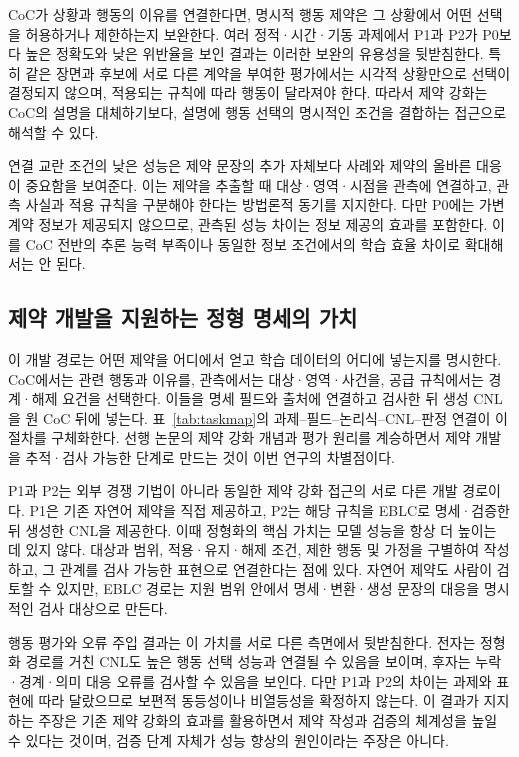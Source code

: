 \documentclass[10pt,a4paper,twocolumn]{article}\usepackage[margin=18mm]{geometry}\usepackage{fontspec,kotex}
\begin{document}
CoC가 상황과 행동의 이유를 연결한다면, 명시적 행동 제약은 그 상황에서 어떤 선택을 허용하거나 제한하는지 보완한다. 여러 정적·시간·기동 과제에서 P1과 P2가 P0보다 높은 정확도와 낮은 위반율을 보인 결과는 이러한 보완의 유용성을 뒷받침한다. 특히 같은 장면과 후보에 서로 다른 계약을 부여한 평가에서는 시각적 상황만으로 선택이 결정되지 않으며, 적용되는 규칙에 따라 행동이 달라져야 한다. 따라서 제약 강화는 CoC의 설명을 대체하기보다, 설명에 행동 선택의 명시적인 조건을 결합하는 접근으로 해석할 수 있다.\par

연결 교란 조건의 낮은 성능은 제약 문장의 추가 자체보다 사례와 제약의 올바른 대응이 중요함을 보여준다. 이는 제약을 추출할 때 대상·영역·시점을 관측에 연결하고, 관측 사실과 적용 규칙을 구분해야 한다는 방법론적 동기를 지지한다. 다만 P0에는 가변 계약 정보가 제공되지 않으므로, 관측된 성능 차이는 정보 제공의 효과를 포함한다. 이를 CoC 전반의 추론 능력 부족이나 동일한 정보 조건에서의 학습 효율 차이로 확대해서는 안 된다.\par

\subsection{제약 개발을 지원하는 정형 명세의 가치}

이 개발 경로는 어떤 제약을 어디에서 얻고 학습 데이터의 어디에 넣는지를 명시한다. CoC에서는 관련 행동과 이유를, 관측에서는 대상·영역·사건을, 공급 규칙에서는 경계·해제 요건을 선택한다. 이들을 명세 필드와 출처에 연결하고 검사한 뒤 생성 CNL을 원 CoC 뒤에 넣는다. 표~\ref{tab:taskmap}의 과제--필드--논리식--CNL--판정 연결이 이 절차를 구체화한다. 선행 논문의 제약 강화 개념과 평가 원리를 계승하면서 제약 개발을 추적·검사 가능한 단계로 만드는 것이 이번 연구의 차별점이다.\par

P1과 P2는 외부 경쟁 기법이 아니라 동일한 제약 강화 접근의 서로 다른 개발 경로이다. P1은 기존 자연어 제약을 직접 제공하고, P2는 해당 규칙을 EBLC로 명세·검증한 뒤 생성한 CNL을 제공한다. 이때 정형화의 핵심 가치는 모델 성능을 항상 더 높이는 데 있지 않다. 대상과 범위, 적용·유지·해제 조건, 제한 행동 및 가정을 구별하여 작성하고, 그 관계를 검사 가능한 표현으로 연결한다는 점에 있다. 자연어 제약도 사람이 검토할 수 있지만, EBLC 경로는 지원 범위 안에서 명세·변환·생성 문장의 대응을 명시적인 검사 대상으로 만든다.\par

행동 평가와 오류 주입 결과는 이 가치를 서로 다른 측면에서 뒷받침한다. 전자는 정형화 경로를 거친 CNL도 높은 행동 선택 성능과 연결될 수 있음을 보이며, 후자는 누락·경계·의미 대응 오류를 검사할 수 있음을 보인다. 다만 P1과 P2의 차이는 과제와 표현에 따라 달랐으므로 보편적 동등성이나 비열등성을 확정하지 않는다. 이 결과가 지지하는 주장은 기존 제약 강화의 효과를 활용하면서 제약 작성과 검증의 체계성을 높일 수 있다는 것이며, 검증 단계 자체가 성능 향상의 원인이라는 주장은 아니다.\par
\end{document}
